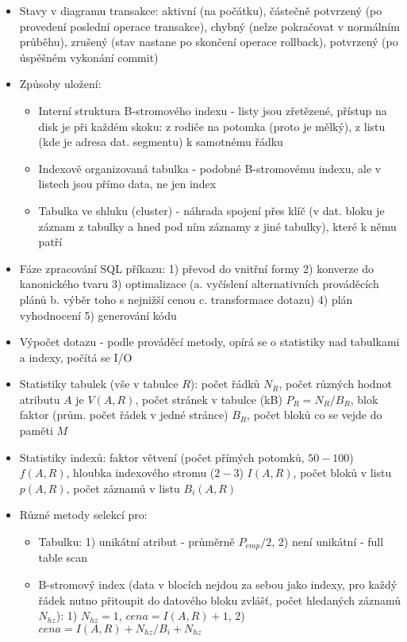 \documentclass[a4paper,hidelinks]{article}
\begin{document}
\begin{itemize}
    \item Stavy v diagramu transakce: aktivní (na počátku), částečně potvrzený (po provedení poslední operace transakce), chybný (nelze pokračovat v normálním průběhu), zrušený (stav nastane po skončení operace rollback), potvrzený (po úspěšném vykonání commit)
    \item Způsoby uložení:
        \begin{itemize}
            \item Interní struktura B-stromového indexu - listy jsou zřetězené, přístup na disk je při každém skoku: z rodiče na potomka (proto je mělký), z listu (kde je adresa dat. segmentu) k samotnému řádku
            \item Indexově organizovaná tabulka - podobné B-stromovému indexu, ale v listech jsou přímo data, ne jen index
            \item Tabulka ve shluku (cluster) - náhrada spojení přes klíč (v dat. bloku je záznam z tabulky a hned pod ním záznamy z jiné tabulky), které k němu patří
        \end{itemize}
    \item Fáze zpracování SQL příkazu: 1) převod do vnitřní formy 2) konverze do kanonického tvaru 3) optimalizace (a. vyčíslení alternativních prováděcích plánů b. výběr toho s nejnižší cenou c. transformace dotazu) 4) plán vyhodnocení 5) generování kódu
    \item Výpočet dotazu - podle prováděcí metody, opírá se o statistiky nad tabulkami a indexy, počítá se I/O
    \item Statistiky tabulek (vše v tabulce $R$): počet řádků $N_R$, počet různých hodnot atributu $A$ je $V(A,R)$, počet stránek v tabulce (kB) $P_R=N_R/B_R$, blok faktor (prům. počet řádek v jedné stránce) $B_R$, počet bloků co se vejde do paměti $M$
    \item Statistiky indexů: faktor větvení (počet přímých potomků, $50-100$) $f(A,R)$, hloubka indexového stromu ($2-3$) $I(A,R)$, počet bloků v listu $p(A,R)$, počet záznamů v listu $B_i(A,R)$
    \item Různé metody selekcí pro:
    \begin{itemize}
        \item Tabulku: 1) unikátní atribut - průměrně $P_{emp}/2$, 2) není unikátní - full table scan
        \item B-stromový index (data v blocích nejdou za sebou jako indexy, pro každý řádek nutno přitoupit do datového bloku zvlášť, počet hledaných záznamů $N_{hz}$): 1) $N_{hz}=1$, $cena=I(A,R)+1$,  2) $cena=I(A,R)+N_{hz}/B_i+N_{hz}$

\end{itemize}
\end{itemize}
\end{document}
